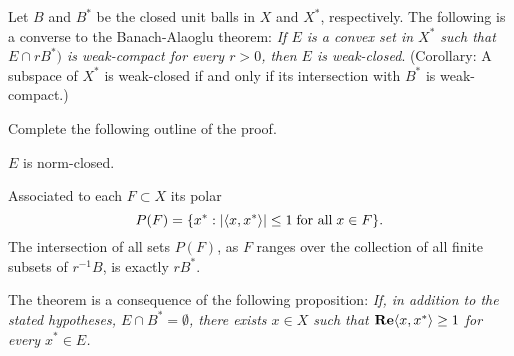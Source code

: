 \begin{enumerate}
\unfinished

\begin{excopy}
Let $B$ and \(B^*\) be the closed unit balls in $X$ and \(X^*\), respectively.
 The following is a
converse to the Banach-Alaoglu theorem:
\textsl{If $E$ is a convex set in \(X^*\) such that \(E \cap rB^*)\)
is weak\upstar-compact
 for every \(r > 0\),
 then $E$ is
 weak\upstar-closed}.
 (Corollary: A subspace of \(X^*\)
is weak\upstar-closed if and only if its intersection with \(B^*\)
 is weak\upstar-compact.)

Complete the following outline of the proof.

\begin{itemize}

$E$ is norm-closed.

Associated to each \(F \subset X\) its polar
\begin{equation*}
P(F) = \{x^*: |\langle x, x^* \rangle| \leq 1 \;\textnormal{for all}\; x\in F\}.
\end{equation*}
The intersection of all sets \(P(F)\), as $F$ ranges over the collection of all
 finite subsets
of \(r^{-1}B\), is exactly \(rB^*\).

The theorem is a consequence of the following proposition:
\textsl{
 If, in addition to the
stated hypotheses, \(E \cap B^* = \emptyset\), there exists \(x \in X\)
 such that \(\mathop{\bf Re}\nolimits \langle x, x^* \rangle \geq 1\) for
every \(x^* \in E\).
}


\end{itemize}
\end{excopy}
\end{enumerate}
